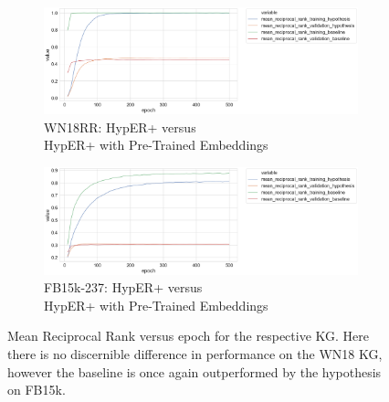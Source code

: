 \begin{figure}[H]
	\begin{subfigure}[b]{.5\linewidth}
   		\centering
    		\includegraphics[width=1.0\linewidth, height=0.6\linewidth]{WN18RR_mean_reciprocal_rank_Results_ptwv}
		\captionsetup{justification=centering}
		\caption{WN18RR: HypER+ versus \\ HypER+ with Pre-Trained Embeddings}
	\end{subfigure}
	\begin{subfigure}[b]{.5\linewidth}
   		\centering
		\includegraphics[width=1.0\linewidth, height=0.6\linewidth]{FB15k-237_mean_reciprocal_rank_Results_ptwv}
		\captionsetup{justification=centering}
		\caption{FB15k-237: HypER+ versus \\ HypER+ with Pre-Trained Embeddings}
	\end{subfigure}
	\captionsetup{justification=centering}
	\caption{Mean Reciprocal Rank versus epoch for the respective KG. Here there is no discernible difference in performance on the WN18 KG, however the baseline is once again outperformed by the hypothesis on FB15k.}
\end{figure}


